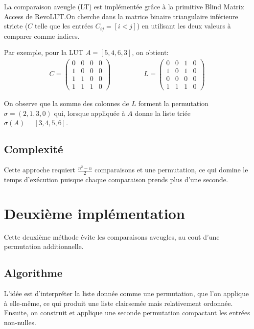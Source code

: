 \documentclass{article}
\begin{document}
La comparaison aveugle (LT) est implémentée grâce à la primitive Blind Matrix Access de RevoLUT.\@ On cherche dans la matrice binaire triangulaire inférieure stricte ($C$ telle que les entrées $C_{ij} = [i < j]$) en utilisant les deux valeurs à comparer comme indices.

\medskip

Par exemple, pour la LUT $A = [5, 4, 6, 3]$, on obtient:
\begin{align*}
    C = \begin{pmatrix}
        0 & 0 & 0 & 0 \\
        1 & 0 & 0 & 0 \\
        1 & 1 & 0 & 0 \\
        1 & 1 & 1 & 0
    \end{pmatrix} \qquad&\qquad
    L = \begin{pmatrix}
        0 & 0 & 1 & 0 \\
        1 & 0 & 1 & 0 \\
        0 & 0 & 0 & 0 \\
        1 & 1 & 1 & 0
    \end{pmatrix}
\end{align*}

On observe que la somme des colonnes de $L$ forment la permutation $\sigma = (2, 1, 3, 0)$ qui, lorsque appliquée à $A$ donne la liste triée $\sigma(A) = [3, 4, 5, 6]$.

\subsection{Complexité}

Cette approche requiert $\frac{n^2-n}{2}$ comparaisons et une permutation, ce qui domine le temps d'exécution puisque chaque comparaison prends plus d'une seconde.

\section{Deuxième implémentation}

Cette deuxième méthode évite les comparaisons aveugles, au cout d'une permutation additionnelle.

\subsection{Algorithme}

L'idée est d'interpréter la liste donnée comme une permutation, que l'on applique à elle-même, ce qui produit une liste clairsemée mais relativement ordonnée. Ensuite, on construit et applique une seconde permutation compactant les entrées non-nulles.
\end{document}
